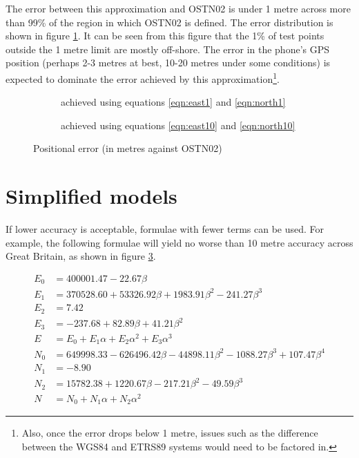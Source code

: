 \documentclass[10pt,a4paper]{article}
\def\gap{\hspace{2cm}}
\begin{document}
The error between this approximation and OSTN02 is under 1 metre across more
than 99\% of the region in which OSTN02 is defined.  The error distribution is
shown in figure \ref{fig:one_metre_model}.  It can be seen from this figure
that the 1\% of test points outside the 1 metre limit are mostly off-shore.
The error in the phone's GPS position (perhaps 2-3 metres at best, 10-20 metres
under some conditions) is expected to dominate the error achieved by this
approximation\footnote{Also, once the error drops below 1 metre, issues such as
the difference between the WGS84 and ETRS89 systems would need to be factored
in.}.

\begin{figure}[htb]
  \begin{subfigure}[b]{0.4\textwidth}
  \centering
  \fbox{
    
  }
  \caption{achieved using equations \eqref{eqn:east1} and \eqref{eqn:north1}}
  \label{fig:one_metre_model}
\end{subfigure}
\gap
  \begin{subfigure}[b]{0.4\textwidth}
  \centering
  \fbox{
    
  }
  \caption{achieved using equations \eqref{eqn:east10} and \eqref{eqn:north10}}
  \label{fig:ten-metre-model}
\end{subfigure}
  \caption{Positional error (in metres against OSTN02)}
\hrulefill
\end{figure}

\section {Simplified models}

If lower accuracy is acceptable, formulae with fewer terms can be used.  For
example, the following formulae will yield no worse than 10 metre accuracy
across Great Britain, as shown in figure \ref{fig:ten-metre-model}.

\begin{align}
E_0 &= 400001.47 -22.67\beta\nonumber \\
E_1 &= 370528.60 +53326.92\beta +1983.91\beta^2 -241.27\beta^3\nonumber \\
E_2 &= 7.42\nonumber \\
E_3 &= -237.68 +82.89\beta +41.21\beta^2\nonumber \\
E &= E_0 +E_1\alpha +E_2\alpha^2 +E_3\alpha^3
  \label{eqn:east10}
\\[1ex]
N_0 &= 649998.33 -626496.42\beta -44898.11\beta^2 -1088.27\beta^3 +107.47\beta^4\nonumber \\
N_1 &= -8.90\nonumber \\
N_2 &= 15782.38 +1220.67\beta -217.21\beta^2 -49.59\beta^3\nonumber \\
N &= N_0 +N_1\alpha +N_2\alpha^2
  \label{eqn:north10}
\end{align}
\end{document}
